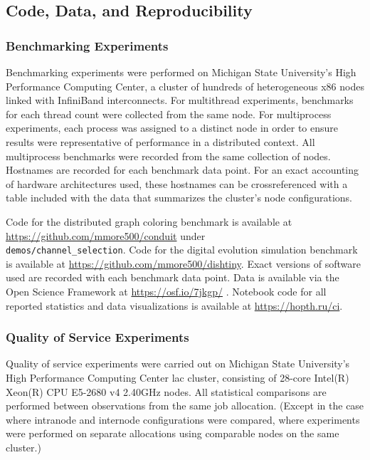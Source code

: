 \subsection{Code, Data, and Reproducibility}

\subsubsection{Benchmarking Experiments} \label{sec:methods-code-data-reproducibility-benchmarking-experiments}

Benchmarking experiments were performed on Michigan State University's High Performance Computing Center, a cluster of hundreds of heterogeneous x86 nodes linked with InfiniBand interconnects.
For multithread experiments, benchmarks for each thread count were collected from the same node.
For multiprocess experiments, each process was assigned to a distinct node in order to ensure results were representative of performance in a distributed context.
All multiprocess benchmarks were recorded from the same collection of nodes.
Hostnames are recorded for each benchmark data point.
For an exact accounting of hardware architectures used, these hostnames can be crossreferenced with a table included with the data that summarizes the cluster's node configurations.

Code for the distributed graph coloring benchmark is available at \url{https://github.com/mmore500/conduit} under \\ \texttt{demos/channel\_selection}.
Code for the digital evolution simulation benchmark is available at \url{https://github.com/mmore500/dishtiny}.
Exact versions of software used are recorded with each benchmark data point.
Data is available via the Open Science Framework at \url{https://osf.io/7jkgp/} \citep{foster2017open}.
Notebook code for all reported statistics and data visualizations is available at \url{https://hopth.ru/ci}.

\subsubsection{Quality of Service Experiments}

Quality of service experiments were carried out on Michigan State University's High Performance Computing Center lac cluster, consisting of 28-core Intel(R) Xeon(R) CPU E5-2680 v4 \@ 2.40GHz nodes.
All statistical comparisons are performed between observations from the same job allocation.
(Except in the case where intranode and internode configurations were compared, where experiments were performed on separate allocations using comparable nodes on the same cluster.)

